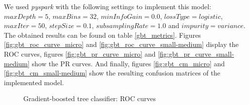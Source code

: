 \documentclass[LaM,binding=0.6cm, english]{sapthesis}
\begin{document}
We used \textit{pyspark} with the following settings to implement this model: $maxDepth = 5$, $maxBins = 32$, $minInfoGain = 0.0$, $lossType = logistic$, $maxIter = 50$, $stepSize = 0.1$, $subsamplingRate = 1.0$ and $impurity = variance$. The obtained results can be found on table \ref{gbt_metrics}. Figures \ref{fig:gbt_roc_curve_micro} and \ref{fig:gbt_roc_curve_small-medium} display the ROC curves, figures \ref{fig:gbt_pr_curve_micro} and \ref{fig:gbt_pr_curve_small-medium} show the PR curves. And finally, figures \ref{fig:gbt_cm_micro} and \ref{fig:gbt_cm_small-medium} show the resulting confusion matrices of the implemented model.
 
\begin{table}[!ht]
\centering
{}
\vspace{2mm}
\caption{Gradient-boosted tree classifier metrics}
\label{gbt_metrics}
\end{table}

\begin{figure}[!ht]
  \centering
  \hfill
  \caption{Gradient-boosted tree classifier: ROC curves}
\end{figure}
\end{document}
